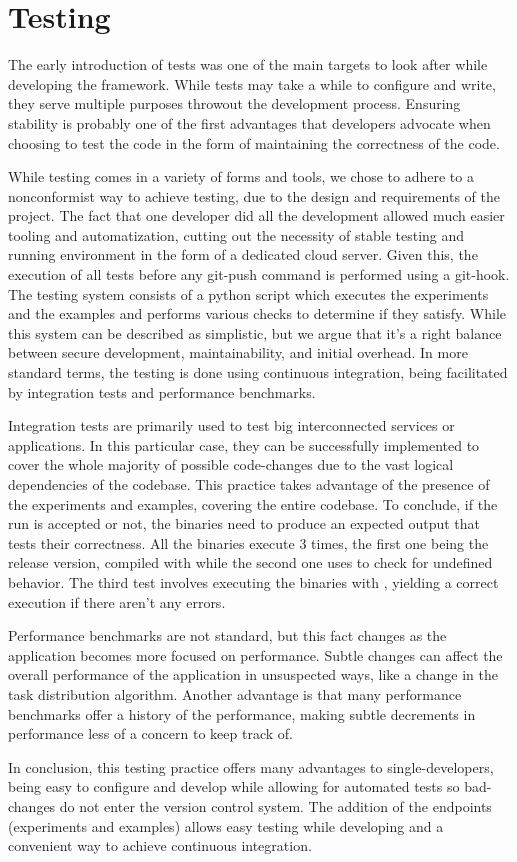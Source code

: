 \section{Testing}

The early introduction of tests was one of the main targets to look after while developing the framework. While tests may take a while to configure and write, they serve multiple purposes throwout the development process. Ensuring stability is probably one of the first advantages that developers advocate when choosing to test the code in the form of maintaining the correctness of the code. 

While testing comes in a variety of forms and tools, we chose to adhere to a nonconformist way to achieve testing, due to the design and requirements of the project. The fact that one developer did all the development allowed much easier tooling and automatization, cutting out the necessity of stable testing and running environment in the form of a dedicated cloud server. Given this, the execution of all tests before any git-push command is performed using a git-hook. The testing system consists of a python script which executes the experiments and the examples and performs various checks to determine if they satisfy. While this system can be described as simplistic, but we argue that it's a right balance between secure development, maintainability, and initial overhead. In more standard terms, the testing is done using continuous integration, being facilitated by integration tests and performance benchmarks.

Integration tests are primarily used to test big interconnected services or applications. In this particular case, they can be successfully implemented to cover the whole majority of possible code-changes due to the vast logical dependencies of the codebase. This practice takes advantage of the presence of the experiments and examples, covering the entire codebase. To conclude, if the run is accepted or not, the binaries need to produce an expected output that tests their correctness. All the binaries execute 3 times, the first one being the release version, compiled with  while the second one uses  to check for undefined behavior. The third test involves executing the binaries with , yielding a correct execution if there aren't any errors.

Performance benchmarks are not standard, but this fact changes as the application becomes more focused on performance. Subtle changes can affect the overall performance of the application in unsuspected ways, like a change in the task distribution algorithm. Another advantage is that many performance benchmarks offer a history of the performance, making subtle decrements in performance less of a concern to keep track of.

In conclusion, this testing practice offers many advantages to single-developers, being easy to configure and develop while allowing for automated tests so bad-changes do not enter the version control system. The addition of the endpoints (experiments and examples) allows easy testing while developing and a convenient way to achieve continuous integration.